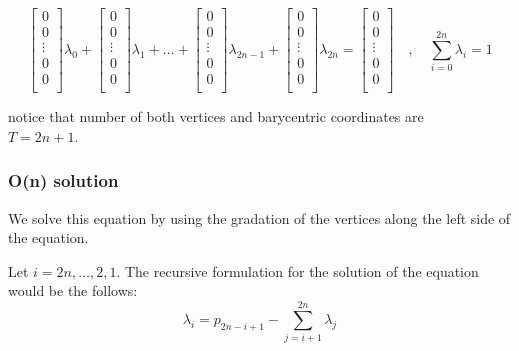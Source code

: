 		\begin{equation}
		\begin{bmatrix} 0\\ 0\\ \vdots \\ 0\\ 0\\ \end{bmatrix} \lambda_0 + 
		\begin{bmatrix} 0\\ 0\\ \vdots \\ 0\\ 0\\ \end{bmatrix} \lambda_1 + 
		\dots +
		\begin{bmatrix} 0\\ 0\\ \vdots \\ 0\\ 0\\ \end{bmatrix} \lambda_{2n-1} + 
		\begin{bmatrix} 0\\ 0\\ \vdots \\ 0\\ 0\\ \end{bmatrix} \lambda_{2n}
		=
		\begin{bmatrix} 0\\ 0\\ \vdots \\ 0\\ 0\\ \end{bmatrix}  \quad , \quad
		\sum_{i=0}^{2n}\lambda_i = 1
		\end{equation} 
			
		
		notice that number of both vertices and barycentric coordinates are\\ $T = 2n + 1$.
		
		
		
		\subsubsection{O(n) solution}
		
		We solve this equation by using the gradation of the vertices along the left side of the equation.
		
		Let $i = 2n , \dots , 2,1$.
		The recursive formulation for the solution of the equation would be the follows:
		\begin{equation} \label{eq:3.14}
		\lambda_i = p_{2n-i+1} - \sum_{j=i+1}^{2n} \lambda_j
		\end{equation}
		
